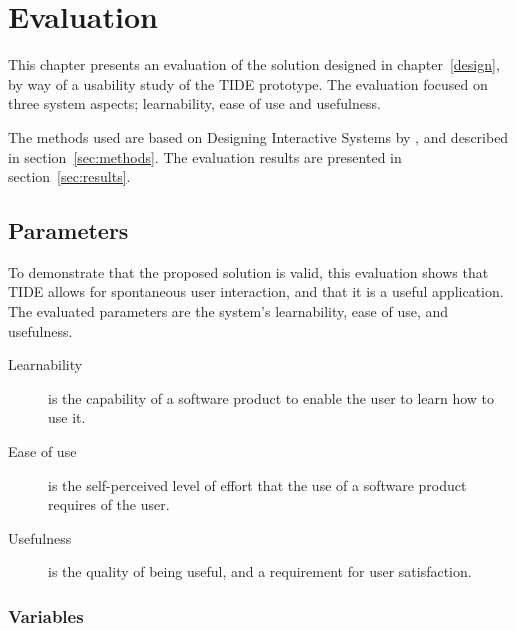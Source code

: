 

\chapter{Evaluation}
\label{evaluation}

This chapter presents an evaluation of the solution designed in chapter~\ref{design}, by way of a usability study of the TIDE prototype.
The evaluation focused on three system aspects; learnability, ease of use and usefulness.

The methods used are based on Designing Interactive Systems by
\cite{Benyon:2010}, and described in section~\ref{sec:methods}.
The evaluation results are presented in section~\ref{sec:results}.

\section{Parameters}
\label{sec:parameters}

To demonstrate that the proposed solution is valid,
this evaluation shows that TIDE allows for spontaneous user interaction, and that it is a useful application.
The evaluated parameters are the system's learnability, ease of use, and usefulness.

\begin{description}
\item[Learnability] is the capability of a software product to enable the user to learn how to use it.

\item[Ease of use] is the self-perceived level of effort that the use of a software product requires of the user.

\item[Usefulness] is the quality of being useful, and a requirement for user satisfaction.

\end{description}

\subsection{Variables}

